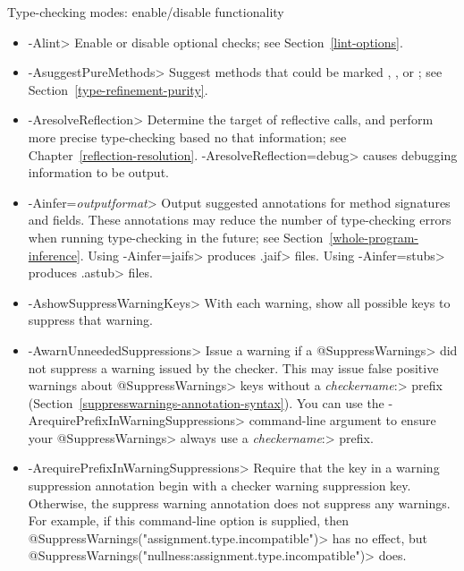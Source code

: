 Type-checking modes:  enable/disable functionality
\begin{itemize}
\item \<-Alint>
  Enable or disable optional checks; see Section~\ref{lint-options}.
\item \<-AsuggestPureMethods>
  Suggest methods that could be marked
  ,
  ,
  or ; see
  Section~\ref{type-refinement-purity}.
\item \<-AresolveReflection>
  Determine the target of reflective calls, and perform more precise
  type-checking based no that information; see
  Chapter~\ref{reflection-resolution}.  \<-AresolveReflection=debug> causes
  debugging information to be output.
\item \<-Ainfer=\emph{outputformat}>
  Output suggested annotations for method signatures and fields.
  These annotations may reduce the number of type-checking
  errors when running type-checking in the future; see
  Section~\ref{whole-program-inference}.
  Using \<-Ainfer=jaifs> produces \<.jaif> files.
  Using \<-Ainfer=stubs> produces \<.astub> files.
\item \<-AshowSuppressWarningKeys>
  With each warning, show all possible keys to suppress that warning.
\item \<-AwarnUnneededSuppressions>
  Issue a warning if a \<@SuppressWarnings> did not suppress a warning
  issued by the checker.  This may issue false positive warnings about
  \<@SuppressWarnings> keys without a \<\emph{checkername}:> prefix
  (Section~\ref{suppresswarnings-annotation-syntax}).  You can use the
  \<-ArequirePrefixInWarningSuppressions> command-line argument to ensure
  your \<@SuppressWarnings> always use a \<\emph{checkername}:> prefix.
\item \<-ArequirePrefixInWarningSuppressions>
  Require that the key in a warning suppression annotation begin with a checker
  warning suppression key.  Otherwise, the suppress warning annotation does not
  suppress any warnings.  For example, if this command-line option is
  supplied, then \<@SuppressWarnings("assignment.type.incompatible")> has no effect, but
  \<@SuppressWarnings("nullness:assignment.type.incompatible")> does.
\end{itemize}

